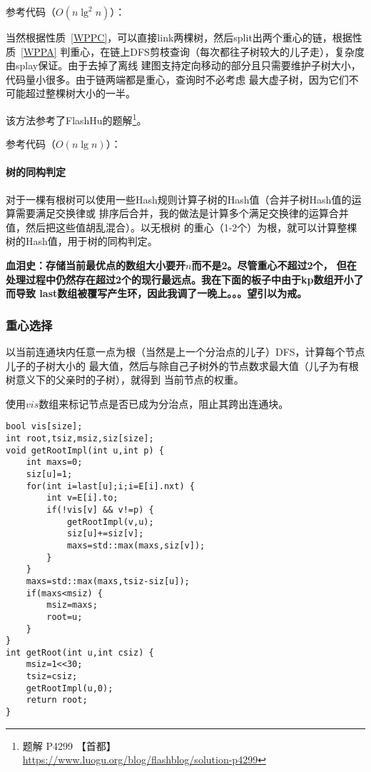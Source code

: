 参考代码（$O(n\lg^2n)$）：


当然根据性质~\ref{WPPC}，可以直接link两棵树，然后split出两个重心的链，根据性质~\ref{WPPA}
判重心，在链上DFS剪枝查询（每次都往子树较大的儿子走），复杂度由splay保证。由于去掉了离线
建图支持定向移动的部分且只需要维护子树大小，代码量小很多。由于链两端都是重心，查询时不必考虑
最大虚子树，因为它们不可能超过整棵树大小的一半。

该方法参考了FlashHu的题解\footnote{
    题解 P4299 【首都】\\
    \url{https://www.luogu.org/blog/flashblog/solution-p4299}
}。

参考代码（$O(n\lg n)$）：


\paragraph{树的同构判定}
对于一棵有根树可以使用一些Hash规则计算子树的Hash值（合并子树Hash值的运算需要满足交换律或
排序后合并，我的做法是计算多个满足交换律的运算合并值，然后把这些值胡乱混合）。以无根树
的重心（1-2个）为根，就可以计算整棵树的Hash值，用于树的同构判定。

{\bfseries 血泪史：存储当前最优点的数组大小要开$n$而不是2。尽管重心不超过2个，
但在处理过程中仍然存在超过2个的现行最远点。我在下面的板子中由于kp数组开小了而导致
last数组被覆写产生环，因此我调了一晚上。。。望引以为戒。}



\subsubsection{重心选择}
以当前连通块内任意一点为根（当然是上一个分治点的儿子）DFS，计算每个节点儿子的子树大小的
最大值，然后与除自己子树外的节点数求最大值（儿子为有根树意义下的父亲时的子树），就得到
当前节点的权重。

使用$vis$数组来标记节点是否已成为分治点，阻止其跨出连通块。

\begin{lstlisting}[title=getRoot]
bool vis[size];
int root,tsiz,msiz,siz[size];
void getRootImpl(int u,int p) {
    int maxs=0;
    siz[u]=1;
    for(int i=last[u];i;i=E[i].nxt) {
        int v=E[i].to;
        if(!vis[v] && v!=p) {
            getRootImpl(v,u);
            siz[u]+=siz[v];
            maxs=std::max(maxs,siz[v]);
        }
    }
    maxs=std::max(maxs,tsiz-siz[u]);
    if(maxs<msiz) {
        msiz=maxs;
        root=u;
    }
}
int getRoot(int u,int csiz) {
    msiz=1<<30;
    tsiz=csiz;
    getRootImpl(u,0);
    return root;
}
\end{lstlisting}

